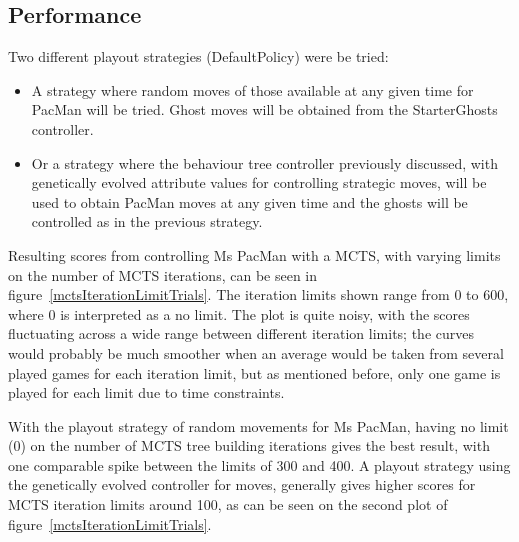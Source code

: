 \documentclass[conference]{IEEEtran}
\begin{document}
\subsection{Performance}

Two different playout strategies (DefaultPolicy) were be tried:
\begin{itemize}
	\item A strategy where random moves of those available at any given time for PacMan will be tried.  Ghost moves will be obtained from the StarterGhosts controller.
	\item Or a strategy where the behaviour tree controller previously discussed, with genetically evolved attribute values for controlling strategic moves, will be used to obtain PacMan moves at any given time and the ghosts will be controlled as in the previous strategy.
\end{itemize}

Resulting scores from controlling Ms PacMan with a MCTS, with varying limits on the number of MCTS iterations, can be seen in figure~\ref{mctsIterationLimitTrials}.  The iteration limits shown range from 0 to 600, where 0 is interpreted as a no limit.  The plot is quite noisy, with the scores fluctuating across a wide range between different iteration limits; the curves would probably be much smoother when an average would be taken from several played games for each iteration limit, but as mentioned before, only one game is played for each limit due to time constraints.

With the playout strategy of random movements for Ms PacMan, having no limit (0) on the number of MCTS tree building iterations gives the best result, with one comparable spike between the limits of 300 and 400.  A playout strategy using the genetically evolved controller for moves, generally gives higher scores for MCTS iteration limits around 100, as can be seen on the second plot of figure~\ref{mctsIterationLimitTrials}.
\end{document}
